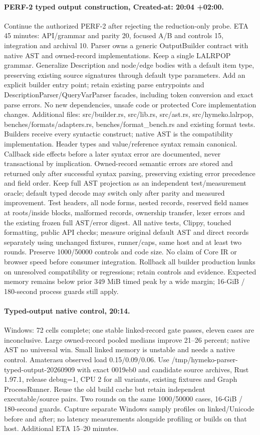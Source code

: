 \documentclass[11pt,a4paper]{article}
\begin{document}
\paragraph{PERF-2 typed output construction, Created-at: 20:04 +02:00.}
Continue the authorized PERF-2 after rejecting the reduction-only probe. ETA
45 minutes: API/grammar and parity 20, focused A/B and controls 15, integration
and archival 10. Parser owns a generic OutputBuilder contract with native AST
and owned-record implementations. Keep a single LALRPOP grammar. Generalize
Description and node/edge bodies with a default item type, preserving existing
source signatures through default type parameters. Add an explicit builder entry
point; retain existing parse entrypoints and DescriptionParser/QueryVarParser
facades, including token conversion and exact parse errors. No new dependencies,
unsafe code or protected Core implementation changes. Additional files:
src/builder.rs, src/lib.rs, src/ast.rs, src/hymeko.lalrpop,
benches/formats/adapters.rs, benches/format\_bench.rs and existing format tests.
Builders receive every syntactic construct; native AST is the compatibility
implementation. Header types and value/reference syntax remain canonical. Callback
side effects before a later syntax error are documented, never transactional by
implication. Owned-record semantic errors are stored and returned only after
successful syntax parsing, preserving existing error precedence and field order.
Keep full AST projection as an independent test/measurement oracle; default typed
decode may switch only after parity and measured improvement. Test headers,
all node forms, nested records, reserved field names at roots/inside blocks,
malformed records, ownership transfer, lexer errors and the existing frozen full
AST/error digest. All native tests, Clippy, touched formatting, public API checks;
measure original default AST and direct records separately using unchanged fixtures,
runner/caps, same host and at least two rounds. Preserve 1000/50000 controls and
code size. No claim of Core IR or browser speed before consumer integration.
Rollback all builder production hunks on unresolved compatibility or regressions;
retain controls and evidence. Expected memory remains below prior 349 MiB timed
peak by a wide margin; 16-GiB / 180-second process guards still apply.
\paragraph{Typed-output native control, 20:14.}
Windows: 72 cells complete; one stable linked-record gate passes, eleven cases
are inconclusive. Large owned-record pooled medians improve 21--26 percent;
native AST no universal win. Small linked memory is unstable and needs a
native control. Amaterasu observed load 0.15/0.09/0.06. Use /tmp/hymeko-parser-typed-output-20260909
with exact 0019eb0 and candidate source archives, Rust 1.97.1, release debug=1,
CPU 2 for all variants, existing fixtures and Graph ProcessRunner. Reuse the old
build cache but retain independent executable/source pairs. Two rounds on the
same 1000/50000 cases, 16-GiB / 180-second guards. Capture separate Windows samply
profiles on linked/Unicode before and after; no latency measurements alongside
profiling or builds on that host. Additional ETA 15--20 minutes.
\end{document}
